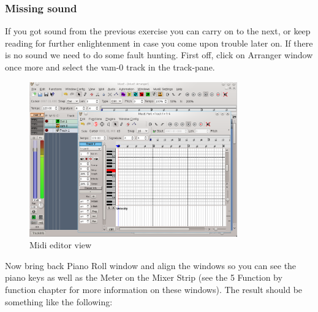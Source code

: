 \documentclass[a4paper]{report}
\newcommand{\screenshotwidth}[0]{0.8\textwidth}
\begin{document}
\subsubsection{Missing sound}
If you got sound from the previous exercise you can carry on to the next,
or keep reading for further enlightenment in case you come upon trouble
later on. If there is no sound we need to do some fault hunting. First
off, click on Arranger window once more and select the vam-0 track in the
track-pane.
\begin{figure}[htp]
\centering \includegraphics[width=\screenshotwidth]
{pics/main_window_with_midi_editor_vam}
\caption{Midi editor view}
\label{fig:Midi editor}
\end{figure}
Now bring back Piano Roll window and align the windows so you
can see the piano keys as well as the Meter on the Mixer Strip (see the
5 Function by function chapter for more information on these windows).
The result should be something like the following:
\end{document}
